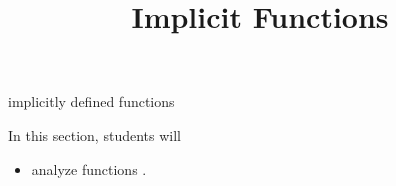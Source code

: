 \documentclass{ximera}
\title{Implicit Functions}
\begin{document}
\begin{abstract}
%
\end{abstract}
\maketitle


implicitly defined functions


\begin{sectionOutcomes}
In this section, students will 

\begin{itemize}
\item analyze functions .
\end{itemize}
\end{sectionOutcomes}
\end{document}
